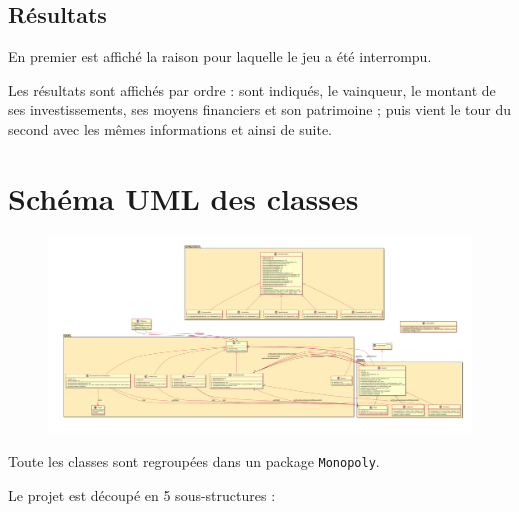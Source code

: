 \documentclass[11pt, a4paper]{report}
\begin{document}
	
	\section{Résultats}
	
	En premier est affiché la raison pour laquelle le jeu a été interrompu.
	
	Les résultats sont affichés par ordre : sont indiqués, le vainqueur, le montant de ses investissements, ses moyens financiers et son patrimoine ; puis vient le tour du second avec les mêmes informations et ainsi de suite.
	
	
	
	\chapter{Schéma UML des classes}
	
	\begin{figure}[h]
		\centering
		\includegraphics[width=1.1\textwidth]{images/umlFin.png}
	\end{figure}

	\pagebreak
	
	Toute les classes sont regroupées dans un package \verb|Monopoly|.
	
	Le projet est découpé en 5 sous-structures :
	
\end{document}
